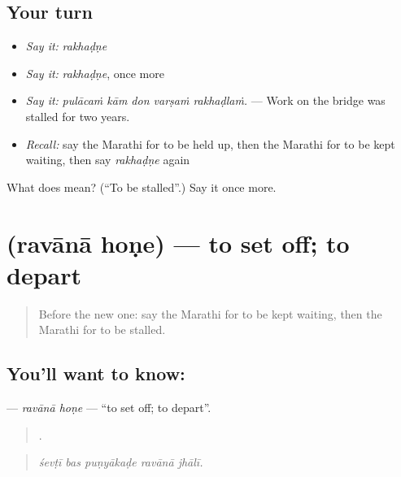 \subsection*{Your turn}
\begin{itemize}
\raggedright
  \item \emph{Say it:} \emph{rakhaḍṇe}
  \item \emph{Say it:} \emph{rakhaḍṇe}, once more
  \item \emph{Say it:} \emph{pulācaṁ kām don varṣaṁ rakhaḍlaṁ.} — Work on the bridge was stalled for two years.
  \item \emph{Recall:} say the Marathi for to be held up, then the Marathi for to be kept waiting, then say \emph{rakhaḍṇe} again
\end{itemize}

\begin{tcolorbox}[breakable,colback=teal!4,colframe=teal!35!black,title={Before you move on}]
What does  mean? (\textquotedblleft{}To be stalled\textquotedblright{}.) Say it once more.
\end{tcolorbox}
\section[\texorpdfstring{\mr{रवाना} \mr{होणे} (ravānā hoṇe)}{रवाना होणे (ravānā hoṇe)}]{  (ravānā hoṇe) — to set off; to depart}

\label{lesson:MR-C397-ravana-hone}



\begin{quote}
Before the new one: say the Marathi for to be kept waiting, then the Marathi for to be stalled.
\end{quote}

\subsection*{You'll want to know:  }
\textbf{ } — \emph{ravānā hoṇe} — \textquotedblleft{}to set off; to depart\textquotedblright{}.

\begin{quote}
    .
\end{quote}

\begin{quote}
\emph{śevṭī bas puṇyākaḍe ravānā jhālī.}
\end{quote}

